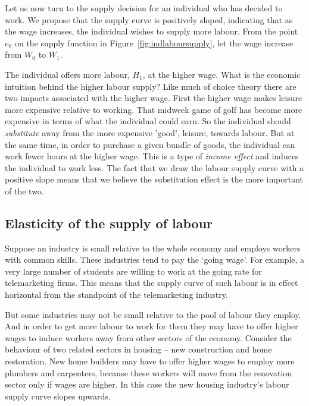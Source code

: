 Let us now turn to the supply decision for an individual who has decided to work. We propose that the supply curve is positively sloped, indicating that as the wage increases, the individual wishes to supply more labour. From the point $e_0$ on the supply function in Figure~\ref{fig:indlaboursupply}, let the wage increase from $W_0$ to $W_1$.



The individual offers more labour, $H_1$, at the higher wage.  What is the economic intuition behind the higher labour supply? Like much of choice theory there are two impacts associated with the higher wage.  First the higher wage makes leisure more expensive relative to working. That midweek game of golf has become more expensive in terms of what the individual could earn. So the individual should \textit{substitute} away from the more expensive 'good', leisure, towards labour.  But at the same time, in order to purchase a given bundle of goods, the individual can work fewer hours at the higher wage. This is a type of \textit{income effect} and induces the individual to work less.  The fact that we draw the labour supply curve with a positive slope means that we believe the substitution effect is the more important of the two.

\subsection*{Elasticity of the supply of labour}

Suppose an industry is small relative to the whole economy and employs workers with common skills. These industries tend to pay the `going wage'. For example, a very large number of students are willing to work at the going rate for telemarketing firms. This means that the supply curve of such labour is in effect horizontal from the standpoint of the telemarketing industry. 

But some industries may not be small relative to the pool of labour they employ. And in order to get more labour to work for them they may have to offer higher wages to induce workers away from other sectors of the economy. Consider the behaviour of two related sectors in housing -- new construction and home restoration. New home builders may have to offer higher wages to employ more plumbers and carpenters, because these workers will move from the renovation sector only if wages are higher. In this case the new housing industry's labour supply curve slopes upwards.

